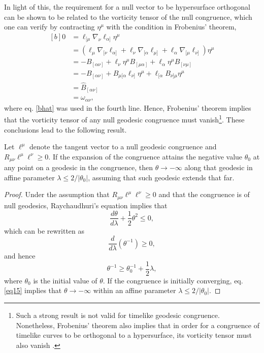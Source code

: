 \documentclass[
12pt,		%
openright,	%
twoside,  %
a4paper,			%
chapter=TITLE,		%
english,			%
french,				%
spanish,			%
brazil				%
]{USPSC-classe/USPSC}
\begin{document}
In light of this, the requirement for a null vector to be hypersurface orthogonal can be shown to be related to the vorticity tensor of the null congruence, which one can verify by contracting $\eta^{\mu}$ with the condition in Frobenius' theorem, 
\begin{equation}
    \begin{aligned}[b]
    0 &=\ell_{[\mu}\nabla_{\nu}\ell_{\alpha]}\eta^{\mu}\\
    &=(\ell_{\mu}\nabla_{[\nu}\ell_{\alpha]}+\ell_{\nu}\nabla_{[\alpha}\ell_{\mu]}+\ell_{\alpha}\nabla_{[\mu}\ell_{\nu]})\eta^{\mu}\\
    &=-B_{[\alpha\nu]}+\ell_{\nu}\eta^{\mu}B_{[\mu\alpha]}+\ell_{\alpha}\eta^{\mu}B_{[\nu\mu]}\\
    &=-B_{[\alpha\nu]}+B_{\mu[\alpha}\ell_{\nu]}\eta^{\mu}+\ell_{[\alpha}B_{\nu]\mu}\eta^{\mu}\\
    &=\hat{B}_{[\alpha\nu]}\\
    &=\omega_{\alpha\nu},
    \end{aligned}
\end{equation}
where eq. \ref{bhat} was used in the fourth line. Hence, Frobenius' theorem implies that the vorticity tensor of any null geodesic congruence must vanish\footnote{Such a strong result is not valid for timelike geodesic congruence. Nonetheless, Frobenius' theorem also implies that in order for a congruence of timelike curves to be orthogonal to a hypersurface, its vorticity tensor must also vanish \cite{Poisson2004}.}. These conclusions lead to the following result.


\begin{proposition}\label{prop1}
    Let $\ell^{\mu}$ denote the tangent vector to a null geodesic congruence and $R_{\mu\nu}\ell^{\mu}\ell^{\nu}\geq 0$. If the expansion of the congruence attains the negative value $\theta_0$ at any point on a geodesic in the congruence, then $\theta\to -\infty$ along that geodesic in affine parameter $\lambda\leq 2/|\theta_0|$, assuming that such geodesic extends that far.
\end{proposition}
\begin{proof}
Under the assumption that $R_{\mu\nu}\ell^{\mu}\ell^{\nu}\geq 0$ and that the congruence is of null geodesics, Raychaudhuri's equation implies that
\begin{equation}
    \frac{d\theta}{d\lambda}+\frac{1}{2}\theta^2\leq 0,
\end{equation}
which can be rewritten as
\begin{equation}
    \frac{d}{d\lambda}(\theta^{-1})\geq 0,
\end{equation}
and hence
\begin{equation}\label{eq15}
    \theta^{-1}\geq \theta_0^{-1}+\frac{1}{2}\lambda,
\end{equation}
where $\theta_0$ is the initial value of $\theta$. If the congruence is initially converging, eq. \ref{eq15} implies that $\theta\to -\infty$ within an affine parameter $\lambda\leq 2/|\theta_0|$.
\end{proof}
\end{document}
